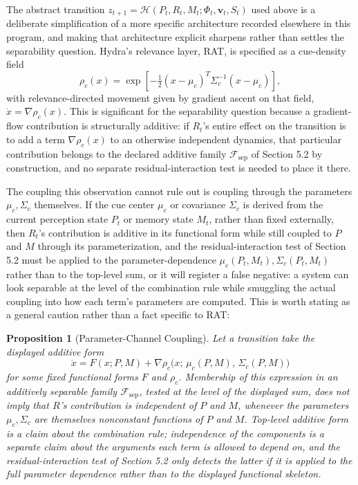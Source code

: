 \documentclass[11pt]{article}
\newtheorem{proposition}{Proposition}
\begin{document}
The abstract transition $z_{t+1} = \mathcal{H}(P_t, R_t, M_t; \Phi_t, \mathbf{v}_t, S_t)$ used above is a deliberate simplification of a more specific architecture recorded elsewhere in this program, and making that architecture explicit sharpens rather than settles the separability question. Hydra's relevance layer, RAT, is specified as a cue-density field
\[
\rho_c(x) = \exp\left[-\tfrac{1}{2}(x - \mu_c)^{T} \Sigma_c^{-1} (x - \mu_c)\right],
\]
with relevance-directed movement given by gradient ascent on that field, $\dot{x} = \nabla \rho_c(x)$. This is significant for the separability question because a gradient-flow contribution is structurally additive: if $R_t$'s entire effect on the transition is to add a term $\nabla \rho_c(x)$ to an otherwise independent dynamics, that particular contribution belongs to the declared additive family $\mathcal{F}_{\mathrm{sep}}$ of Section 5.2 by construction, and no separate residual-interaction test is needed to place it there.

The coupling this observation cannot rule out is coupling through the parameters $\mu_c, \Sigma_c$ themselves. If the cue center $\mu_c$ or covariance $\Sigma_c$ is derived from the current perception state $P_t$ or memory state $M_t$, rather than fixed externally, then $R_t$'s contribution is additive in its functional form while still coupled to $P$ and $M$ through its parameterization, and the residual-interaction test of Section 5.2 must be applied to the parameter-dependence $\mu_c(P_t, M_t), \Sigma_c(P_t, M_t)$ rather than to the top-level sum, or it will register a false negative: a system can look separable at the level of the combination rule while smuggling the actual coupling into how each term's parameters are computed. This is worth stating as a general caution rather than a fact specific to RAT:

\begin{proposition}[Parameter-Channel Coupling]
Let a transition take the displayed additive form
\[
\dot{x} = F(x; P, M) + \nabla \rho_c\bigl(x;\, \mu_c(P, M),\, \Sigma_c(P, M)\bigr)
\]
for some fixed functional forms $F$ and $\rho_c$. Membership of this expression in an additively separable family $\mathcal{F}_{\mathrm{sep}}$, tested at the level of the displayed sum, does not imply that $R$'s contribution is independent of $P$ and $M$, whenever the parameters $\mu_c, \Sigma_c$ are themselves nonconstant functions of $P$ and $M$. Top-level additive form is a claim about the combination rule; independence of the components is a separate claim about the arguments each term is allowed to depend on, and the residual-interaction test of Section 5.2 only detects the latter if it is applied to the full parameter dependence rather than to the displayed functional skeleton.
\end{proposition}
\end{document}
